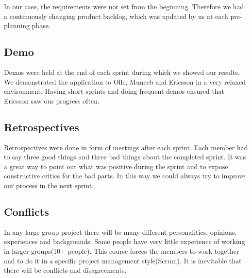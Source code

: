 In our case, the requirements were not set from the beginning. Therefore we had a continuously
changing product backlog, which was updated by us at each pre-planning phase.

\subsection{Demo}
Demos were held at the end of each sprint during which we showed our results.
We demonstrated the application to Olle, Muneeb and Ericsson in a very relaxed environment. Having short sprints and doing frequent
demos ensured that Ericsson saw our progress often.

\subsection{Retrospectives}
Retrospectives were done in form of meetings after each sprint. Each member had to say three good things and three bad things about
the completed sprint. It was a great way to point out what was positive during the sprint
and to expose constructive critics for the bad parts. In this way we could always try to improve our process in the next sprint.

\subsection{Conflicts}
In any large group project there will be many different personalities, opinions, experiences and backgrounds. Some people have very little experience of working in larger groups(10+ people). This course forces the members to work together and to do it in a specific project management style(Scrum). It is inevitable that there will be conflicts and disagreements. 

